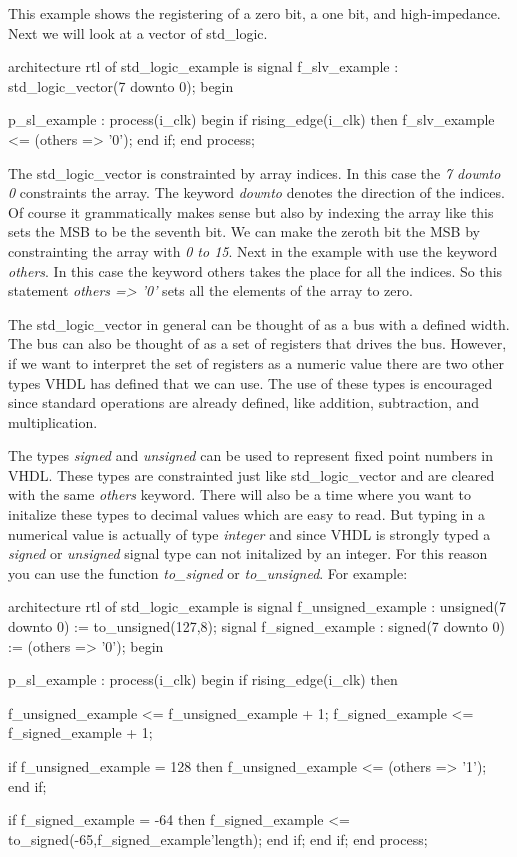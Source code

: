 This example shows the registering of a zero bit, a one bit, and high-impedance. Next we will look at a vector of std\_logic.

\begin{VHDLlisting}[tabsize=4]
architecture rtl of std_logic_example is
	signal f_slv_example  : std_logic_vector(7 downto 0);
begin

p_sl_example : process(i_clk)
begin
	if rising_edge(i_clk) then
		f_slv_example <= (others => '0');
	end if;
end process;
\end{VHDLlisting}

The std\_logic\_vector is constrainted by array indices. In this case the \emph{7 downto 0} constraints the array. The keyword \emph{downto} denotes the direction of the indices. Of course it grammatically makes sense but also by indexing the array like this sets the \ac{MSB} to be the seventh bit. We can make the zeroth bit the \ac{MSB} by constrainting the array with \emph{0 to 15}. Next in the example with use the keyword \emph{others}. In this case the keyword \ac{others} takes the place for all the indices. So this statement \emph{others => '0'} sets all the elements of the array to zero. 
	
The std\_logic\_vector in general can be thought of as a bus with a defined width. The bus can also be thought of as a set of registers that drives the bus. However, if we want to interpret the set of registers as a numeric value there are two other types \ac{VHDL} has defined that we can use. The use of these types is encouraged since standard operations are already defined, like addition, subtraction, and multiplication. 

The types \emph{signed} and \emph{unsigned} can be used to represent fixed point numbers in \ac{VHDL}. These types are constrainted just like std\_logic\_vector and are cleared with the same \emph{others} keyword. There will also be a time where you want to initalize these types to decimal values which are easy to read. But typing in a numerical value is actually of type \emph{integer} and since \ac{VHDL} is strongly typed a \emph{signed} or \emph{unsigned} signal type can not initalized by an integer. For this reason you can use the function \emph{to\_signed} or \emph{to\_unsigned}. For example:

\begin{VHDLlisting}[tabsize=4]
architecture rtl of std_logic_example is
	signal f_unsigned_example : unsigned(7 downto 0) := to_unsigned(127,8);
	signal f_signed_example   : signed(7 downto 0)   := (others => '0');
begin

p_sl_example : process(i_clk)
begin
	if rising_edge(i_clk) then
		
		f_unsigned_example <= f_unsigned_example + 1;
		f_signed_example   <= f_signed_example   + 1;
		
		if f_unsigned_example = 128 then
			f_unsigned_example <= (others => '1');
		end if;
		
		if f_signed_example = -64 then
			f_signed_example <= to_signed(-65,f_signed_example'length);
		end if;		
	end if;
end process;
\end{VHDLlisting}

